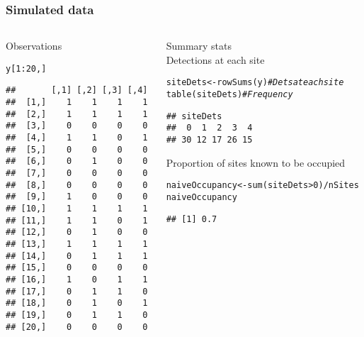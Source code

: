 \documentclass[color=usenames,dvipsnames]{beamer}\usepackage[]{graphicx}\usepackage[]{color}
\makeatletter
\newcommand{\hlnum}[1]{\textcolor[rgb]{0.69,0.494,0}{#1}}%
\newcommand{\hlcom}[1]{\textcolor[rgb]{0.514,0.506,0.514}{\textit{#1}}}%
\newcommand{\hlopt}[1]{\textcolor[rgb]{0,0,0}{#1}}%
\newcommand{\hlstd}[1]{\textcolor[rgb]{0,0,0}{#1}}%
\newcommand{\hlkwb}[1]{\textcolor[rgb]{0,0.341,0.682}{#1}}%
\newcommand{\hlkwd}[1]{\textcolor[rgb]{0.004,0.004,0.506}{#1}}%
\newenvironment{kframe}{%
 \def\at@end@of@kframe{}%
 \ifinner\ifhmode%
  \def\at@end@of@kframe{\end{minipage}}%
  \begin{minipage}{\columnwidth}%
 \fi\fi%
 \def\FrameCommand##1{\hskip\@totalleftmargin \hskip-\fboxsep
 \colorbox{shadecolor}{##1}\hskip-\fboxsep
     \hskip-\linewidth \hskip-\@totalleftmargin \hskip\columnwidth}%
 \MakeFramed {\advance\hsize-\width
   \@totalleftmargin\z@ \linewidth\hsize
   \@setminipage}}%
 {\par\unskip\endMakeFramed%
 \at@end@of@kframe}
\newenvironment{knitrout}{}{} %
\makeatother
\begin{document}
\begin{frame}[fragile]
  \frametitle{Simulated data}
  \begin{columns}
    \begin{column}{0.4\textwidth}
      \small
      Observations
\begin{knitrout}\scriptsize
{}\color{fgcolor}\begin{kframe}
\begin{alltt}
\hlstd{y[}\hlnum{1}\hlopt{:}\hlnum{20}\hlstd{,]}
\end{alltt}
\begin{verbatim}
##       [,1] [,2] [,3] [,4]
##  [1,]    1    1    1    1
##  [2,]    1    1    1    1
##  [3,]    0    0    0    0
##  [4,]    1    1    0    1
##  [5,]    0    0    0    0
##  [6,]    0    1    0    0
##  [7,]    0    0    0    0
##  [8,]    0    0    0    0
##  [9,]    1    0    0    0
## [10,]    1    1    1    1
## [11,]    1    1    0    1
## [12,]    0    1    0    0
## [13,]    1    1    1    1
## [14,]    0    1    1    1
## [15,]    0    0    0    0
## [16,]    1    0    1    1
## [17,]    0    1    1    0
## [18,]    0    1    0    1
## [19,]    0    1    1    0
## [20,]    0    0    0    0
\end{verbatim}
\end{kframe}
\end{knitrout}
  \end{column}
  \begin{column}{0.6\textwidth}
    \pause
    {\centering Summary stats \\}
    \vspace{24pt}
  Detections at each site \\
\begin{knitrout}\scriptsize
{}\color{fgcolor}\begin{kframe}
\begin{alltt}
\hlstd{siteDets} \hlkwb{<-} \hlkwd{rowSums}\hlstd{(y)} \hlcom{# Dets at each site}
\hlkwd{table}\hlstd{(siteDets)}        \hlcom{# Frequency}
\end{alltt}
\begin{verbatim}
## siteDets
##  0  1  2  3  4 
## 30 12 17 26 15
\end{verbatim}
\end{kframe}
\end{knitrout}
\pause
\vfill
\small
Proportion of sites known to be occupied \\
\begin{knitrout}\scriptsize
{}\color{fgcolor}\begin{kframe}
\begin{alltt}
\hlstd{naiveOccupancy} \hlkwb{<-} \hlkwd{sum}\hlstd{(siteDets}\hlopt{>}\hlnum{0}\hlstd{)}\hlopt{/}\hlstd{nSites}
\hlstd{naiveOccupancy}
\end{alltt}
\begin{verbatim}
## [1] 0.7
\end{verbatim}
\end{kframe}
\end{knitrout}


\end{column}
\end{columns}
\end{frame}
\end{document}
